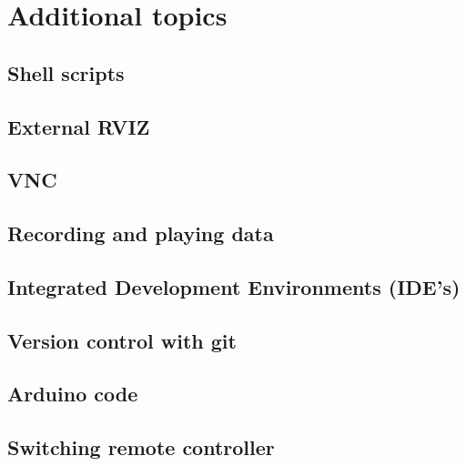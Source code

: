 %
%

\newcommand{\makro}[1]{\texttt{\textbackslash{}#1\{\}}}

\chapter{Additional topics}
\label{sec:advanced}


\section{Shell scripts}
\label{sec:advanced_shell_scripts}

\section{External RVIZ}
\label{sec:advanced_rviz_ext}

\section{VNC}
\label{sec:advanced_vnc}

\section{Recording and playing data}
\label{sec:advanced_rosbag}

\section{Integrated Development Environments (IDE's)}
\label{sec:advanced_ide}

\section{Version control with git}
\label{sec:advanced_git}

\section{Arduino code}
\label{sec:advanced_ide}

\section{Switching remote controller}
\label{sec:advanced_switch}
